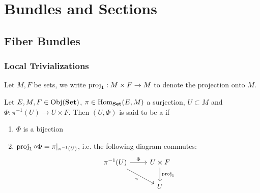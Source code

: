 \documentclass{book}
\begin{document}
	
	
	
	
	
	
	
	
	
	
	
	
	
	
	
	
	
	
	
	
	
	
	
	
	
	
	
	
	
	
	
	
	
	
	
	
	
	
	
	
	
	
	
	
	
	\newpage
	\chapter{Bundles and Sections}
	
	\section{Fiber Bundles}
	
	\subsection{Local Trivializations}
	
	\begin{note} 
		Let $M, F$ be sets, we write $\operatorname{\text{proj}}_1: M \times F \rightarrow M$ to denote the projection onto $M$.
	\end{note}

	\begin{defn} 
		Let $E, M, F \in \operatorname{Obj}(\operatorname*{\text{\textbf{Set}}})$, $\pi \in \operatorname{Hom}_{\operatorname*{\text{\textbf{Set}}}}(E, M)$ a surjection, $U \subset M$ and $\Phi: \pi^{-1}(U) \rightarrow U \times F$. Then $(U, \Phi)$ is said to be a   if 
		\begin{enumerate}
			\item $\Phi$ is a bijection
			\item $\operatorname{\text{proj}}_1 \circ \Phi = \pi|_{\pi^{-1}(U)}$, i.e. the following diagram commutes:
			\[ 
			\begin{tikzcd}
				\pi^{-1}(U) \arrow[r, "\Phi"] \arrow[dr, "\pi"'] & U \times F \arrow[d, "\prj_1"]  \\
				& U
			\end{tikzcd}
			\]
		\end{enumerate}
	\end{defn}
	
\end{document}
